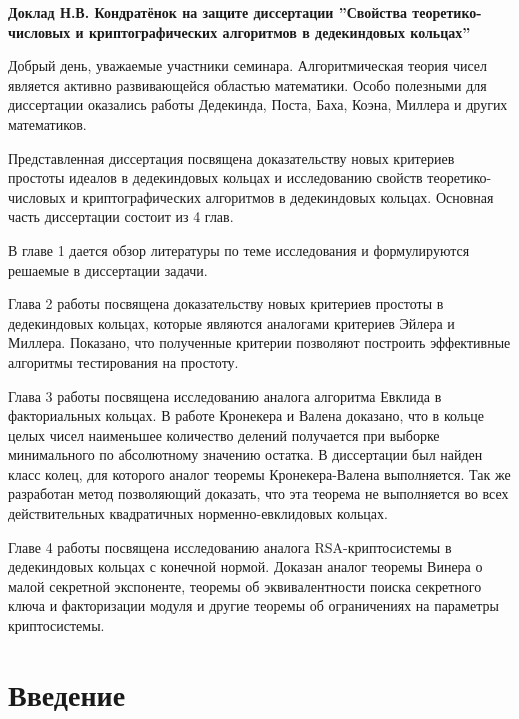 \documentclass[a4paper,12pt]{article} %
\begin{document}
\begin{center}
    \textbf{Доклад Н.В. Кондратёнок на защите диссертации ''Свойства теоретико-числовых и криптографических алгоритмов в дедекиндовых кольцах''}
\end{center}

Добрый день, уважаемые участники семинара.
Алгоритмическая теория чисел является активно развивающейся областью математики.
Особо полезными для диссертации оказались работы Дедекинда, Поста, Баха, Коэна, Миллера и других математиков.

Представленная диссертация посвящена доказательству новых критериев простоты идеалов в дедекиндовых кольцах и исследованию свойств теоретико-числовых и криптографических алгоритмов в дедекиндовых кольцах.
Основная часть диссертации состоит из 4 глав.

В главе 1 дается обзор литературы по теме исследования и формулируются решаемые в диссертации задачи.

Глава 2 работы посвящена доказательству новых критериев простоты в дедекиндовых кольцах, которые являются аналогами критериев Эйлера и Миллера.
Показано, что полученные критерии позволяют построить эффективные алгоритмы тестирования на простоту.

Глава 3 работы посвящена исследованию аналога алгоритма Евклида в факториальных кольцах.
В работе Кронекера и Валена доказано, что в кольце целых чисел наименьшее количество делений получается при выборке минимального по абсолютному значению остатка.
В диссертации был найден класс колец, для которого аналог теоремы Кронекера-Валена выполняется.
Так же разработан метод позволяющий доказать, что эта теорема не выполняется во всех действительных квадратичных норменно-евклидовых кольцах.
    
Главе 4 работы посвящена исследованию аналога RSA-криптосистемы в дедекиндовых кольцах с конечной нормой.
Доказан аналог теоремы Винера о малой секретной экспоненте, теоремы об эквивалентности поиска секретного ключа и факторизации модуля и другие теоремы об ограничениях на параметры криптосистемы.

\section{Введение}
\end{document}
